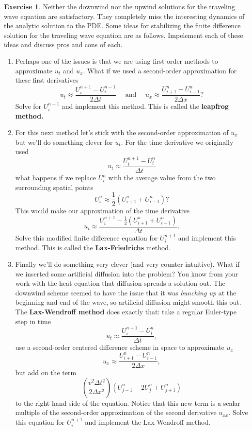\documentclass[
]{book}
\providecommand{\tightlist}{%
  \setlength{\itemsep}{0pt}\setlength{\parskip}{0pt}}
\theoremstyle{definition}
\theoremstyle{definition}
\theoremstyle{definition}
\newtheorem{exercise}{Exercise}[chapter]
\theoremstyle{remark}
\begin{document}
\begin{exercise}
\protect\hypertarget{exr:unnamed-chunk-593}{}{\label{exr:unnamed-chunk-593} }Neither the downwind nor the upwind solutions for the traveling wave equation are satisfactory. They completely miss the interesting dynamics of the analytic solution to the PDE. Some ideas for stabilizing the finite difference solution for the traveling wave equation are as follows. Impelement each of these ideas and discuss pros and cons of each.

\begin{enumerate}
\def\labelenumi{\alph{enumi}.}
\tightlist
\item
  Perhaps one of the issues is that we are using first-order methods to approximate \(u_t\) and \(u_x\). What if we used a second-order approximation for these first derivatives
  \[ u_t \approx \frac{U_i^{n+1} - U_i^{n-1}}{2\Delta t} \quad \text{ and } \quad u_x \approx \frac{U_{i+1}^n - U_{i-1}^n}{2\Delta x}? \]
  Solve for \(U_i^{n+1}\) and implement this method. This is called the \textbf{leapfrog method.}
\item
  For this next method let's stick with the second-order approximation of \(u_x\) but we'll do something clever for \(u_t\). For the time derivative we originally used
  \[ u_t \approx \frac{U_i^{n+1} - U_i^n}{\Delta t} \]
  what happens if we replace \(U_i^n\) with the average value from the two surrounding spatial points
  \[ U_i^n \approx \frac{1}{2} \left( U_{i+1}^n + U_{i-1}^n \right)? \]
  This would make our approximation of the time derivative
  \[ u_t \approx \frac{U_i^{n+1} - \frac{1}{2} \left( U_{i+1}^n + U_{i-1}^n \right)}{\Delta t}. \]
  Solve this modified finite difference equation for \(U_i^{n+1}\) and implement this method. This is called the \textbf{Lax-Friedrichs} method.
\item
  Finally we'll do something very clever (and very counter intuitive). What if we inserted some artificial diffusion into the problem? You know from your work with the heat equation that diffusion spreads a solution out. The downwind scheme seemed to have the issue that it was \emph{bunching up} at the beginning and end of the wave, so artificial diffusion might smooth this out. The \textbf{Lax-Wendroff method} does exactly that: take a regular Euler-type step in time
  \[ u_t \approx \frac{U_i^{n+1} - U_i^n}{\Delta t}, \]
  use a second-order centered difference scheme in space to approximate \(u_x\)
  \[ u_x \approx \frac{U_{i+1}^n - U_{i-1}^n}{2\Delta x}, \]
  but add on the term
  \[ \left( \frac{v^2 \Delta t^2}{2\Delta x^2} \right) \left( U_{j-1}^n - 2 U_j^n + U_{j+1}^n \right) \]
  to the right-hand side of the equation. Notice that this new term is a scalar multiple of the second-order approximation of the second derivative \(u_{xx}\). Solve this equation for \(U_i^{n+1}\) and implement the Lax-Wendroff method.
\end{enumerate}
\end{exercise}
\end{document}
